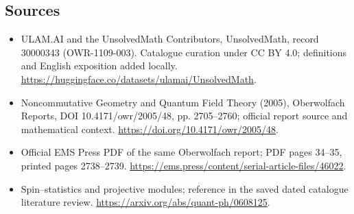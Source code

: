 \documentclass[11pt]{article}
\begin{document}
\subsection{Sources}
\begin{itemize}
\item[\hypertarget{source:30000343:1}{S1}] ULAM.AI and the UnsolvedMath Contributors, UnsolvedMath, record 30000343 (OWR-1109-003). Catalogue curation under CC BY 4.0; definitions and English exposition added locally.
\url{https://huggingface.co/datasets/ulamai/UnsolvedMath}.
\item[\hypertarget{source:30000343:2}{S2}] Noncommutative Geometry and Quantum Field Theory (2005), Oberwolfach Reports, DOI 10.4171/owr/2005/48, pp. 2705--2760; official report source and mathematical context.
\url{https://doi.org/10.4171/owr/2005/48}.
\item[\hypertarget{source:30000343:3}{S3}] Official EMS Press PDF of the same Oberwolfach report; PDF pages 34--35, printed pages 2738--2739.
\url{https://ems.press/content/serial-article-files/46022}.
\item[\hypertarget{source:30000343:4}{S4}] Spin--statistics and projective modules; reference in the saved dated catalogue literature review.
\url{https://arxiv.org/abs/quant-ph/0608125}.
\end{itemize}
\label{end:30000343}
\end{document}

